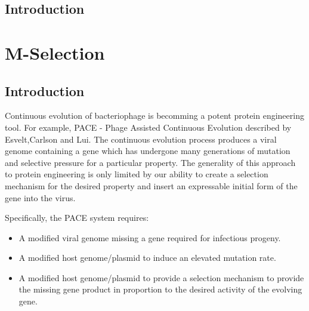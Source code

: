 \documentclass[10pt,letterpaper]{article}
\begin{document}

\linenumbers

\section*{Introduction}
\chapter{M-Selection}
\section{Introduction}
Continuous evolution of bacteriophage is becomming a potent protein engineering
tool\cite{pace}\cite{monsanto}.
For example, PACE - Phage Assisted Continuous Evolution described by Esvelt,Carlson and Lui. 
The continuous evolution process produces a viral genome containing a gene
which has undergone many generations of mutation and selective pressure for
a particular property.  The generality of this approach to protein engineering
is only limited by our ability to create a selection mechanism for the desired
property and insert an expressable initial form of the gene into the virus.

Specifically, the PACE system requires:
\begin{itemize}

\item{}
A modified viral genome missing a gene required for infectious progeny.

\item{}
A modified host genome/plasmid to induce an elevated mutation rate.

\item{}
A modified host genome/plasmid to provide a selection mechanism to provide
the missing gene product in proportion to the desired activity of the evolving
gene.
\end{itemize}
\end{document}
